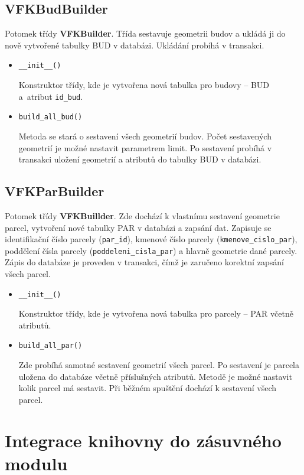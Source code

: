 \subsection{VFKBudBuilder}
Potomek třídy \textbf{VFKBuilder}. Třída sestavuje geometrii budov a
ukládá ji do nově vytvořené tabulky BUD v databázi. Ukládání probíhá v
transakci.
\begin{itemize}[leftmargin=50pt]
\item \verb|__init__()|

Konstruktor třídy, kde je vytvořena nová tabulka pro budovy -- BUD a~atribut \verb|id_bud|.
\item \verb|build_all_bud()|

Metoda se stará o sestavení všech geometrií budov. Počet sestavených geometrií je
možné nastavit parametrem limit. Po sestavení probíhá v transakci
uložení geo\-metrií a atributů do tabulky BUD v databázi.
\end{itemize}
\subsection{VFKParBuilder}
Potomek třídy \textbf{VFKBuillder}. Zde dochází k vlastnímu sestavení
geometrie parcel, vytvoření nové tabulky PAR v databázi a zapsání
dat. Zapisuje se identifikační číslo parcely (\verb|par_id|), kmenové
číslo parcely (\verb|kmenove_cislo_par|), poddělení čísla
parcely (\verb|poddeleni_cisla_par|) a hlavně geometrie dané
parcely. Zápis do databáze je proveden v transakci, čímž je zaručeno
korektní zapsání všech parcel.

\begin{itemize}[leftmargin=50pt]
\item \verb|__init__()|

Konstruktor třídy, kde je vytvořena nová tabulka pro parcely -- PAR včetně atributů.
\item \verb|build_all_par()|

Zde probíhá samotné sestavení geometrií všech parcel. Po sestavení je parcela
uložena do databáze včetně příslušných atributů. Metodě je možné nastavit
kolik parcel má sestavit. Při běžném spuštění dochází k sestavení všech parcel.

\end{itemize}
\section{Integrace knihovny do zásuvného modulu}
\label{sec:integrace_knihovny}


